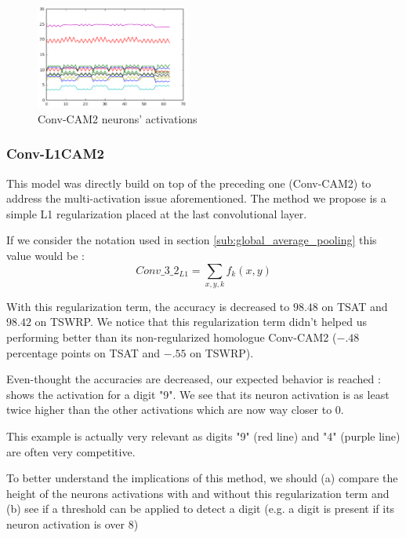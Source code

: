 				\begin{figure}[h]
					\centering
					\includegraphics[width=0.45\textwidth]{images/multiPosGraphConvCAM2}
					\caption{Conv-CAM2 neurons' activations}
					\label{fig:multipose_graph_CAM2}
				\end{figure}

			
			\subsubsection{Conv-L1CAM2}
			\label{ssub:conv_l1cam}
				This model was directly build on top of the preceding one (Conv-CAM2) to address the multi-activation issue aforementioned. The method we propose is a simple L1 regularization placed at the last convolutional layer. 

				If we consider the notation used in section \ref{sub:global_average_pooling} this value would be :
				\begin{equation}
					Conv\_3\_2_{L1} = \sum_{x,y,k}f_k(x,y)
				\end{equation}

				With this regularization term, the accuracy is decreased to $98.48$ on TSAT and $98.42$ on TSWRP. We notice that this regularization term didn't helped us performing better than its non-regularized homologue Conv-CAM2 ($- .48$ percentage points on TSAT and $- .55$ on TSWRP).

				\begin{mdframed}[backgroundcolor = gray!30]
					Even-thought the accuracies are decreased, our expected behavior is reached :  shows the activation for a digit "9". We see that its neuron activation is as least twice higher than the other  activations which are now way closer to 0.

					This example is actually very relevant as digits "9" (red line) and "4" (purple line) are often very competitive.

					To better understand the implications of this method, we should (a) compare the height of the neurons activations with and without this regularization term and (b) see if a threshold can be applied to detect a digit (e.g. a digit is present if its neuron activation is over 8)
				\end{mdframed}
				
